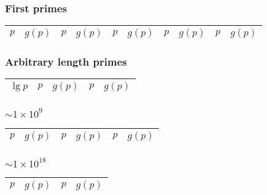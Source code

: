 \subsubsection{First primes}
\begin{table}[h]
  \centering
  \begin{tabular}{|c|c|c|c|c|c|c|c|c|c|}
  \hline
  $p$ & $g(p)$ & $p$ & $g(p)$ & $p$ & $g(p)$ & $p$ & $g(p)$ & $p$ & $g(p)$ \\ \hline
   \hline
  \end{tabular}
\end{table}

\subsubsection{Arbitrary length primes}
\begin{table}[h]
  \centering
  \begin{tabular}{|c|c|c|c|c|}
  \hline
  $\lg p$ & $p$ & $g(p)$ & $p$ & $g(p)$ \\ \hline
   \hline
  \end{tabular}
\end{table}
\newpage

\subsubsection{$\sim 1 \times 10^9$}
\begin{table}[h]
  \centering
  \begin{tabular}{|c|c|c|c|c|c|}
  \hline
  $p$ & $g(p)$ & $p$ & $g(p)$ & $p$ & $g(p)$ \\ \hline
   \hline
  \end{tabular}
\end{table}

\subsubsection{$\sim 1 \times 10^{18}$}
\begin{table}[h]
  \centering
  \begin{tabular}{|c|c|c|c|}
  \hline
  $p$ & $g(p)$ & $p$ & $g(p)$ \\ \hline
   \hline
  \end{tabular}
\end{table}



